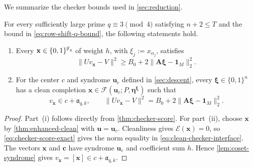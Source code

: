 We summarize the checker bounds used in \cref{sec:reduction}.
\begin{corollary}
\label{cor:checker-interface}
For every sufficiently large prime $q\equiv3\pmod4$ satisfying
$n+2\le T$ and the bound in \cref{eq:row-shift-q-bound}, the
following statements hold.
\begin{enumerate}[label=(\roman*)]
 \item Every $\mathbf x\in\{0,1\}^{\mathbb F_q}$ of weight $h$, with
 $\xi_j:=x_{\alpha_j}$, satisfies
 \[
  \|Uv_{\mathbf x}-V\|^2
  \ge B_0+2\|\mathbf A\boldsymbol\xi-\mathbf1_M\|_2^2.
 \]
 \item For the center $c$ and syndrome $\mathbf u_c$ defined in
 \cref{sec:descent}, every $\boldsymbol\xi\in\{0,1\}^n$ has a clean completion
 $\mathbf x\in\mathcal F(\mathbf u_c;P,\boldsymbol\eta^{\boldsymbol\xi})$
 such that
 \begin{equation}
 \label{eq:clean-checker-interface}
  v_{\mathbf x}\in c+\mathfrak a_{q,k},
  \qquad \|Uv_{\mathbf x}-V\|^2
  =B_0+2\|\mathbf A\boldsymbol\xi-\mathbf1_M\|_2^2.
 \end{equation}
\end{enumerate}
\end{corollary}

\begin{proof}
Part~(i) follows directly from \cref{thm:checker-score}.
For part~(ii), choose $\mathbf x$ by
\cref{thm:enhanced-clean} with $\mathbf u=\mathbf u_c$.  Cleanliness gives
$\mathcal E(\mathbf x)=0$, so
\cref{eq:checker-score-exact} gives
the norm equality in \cref{eq:clean-checker-interface}.  The vectors
$\mathbf x$ and $\mathbf c$ have syndrome $\mathbf u_c$ and coefficient sum
$h$.  Hence \cref{lem:coset-syndrome} gives
$v_{\mathbf x}=[\mathbf x]\in c+\mathfrak a_{q,k}$.
\end{proof}
